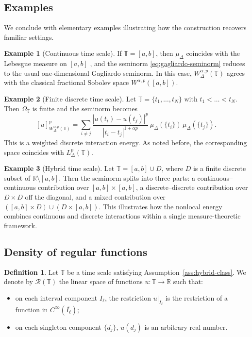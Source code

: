 \documentclass[11pt,a4paper]{article}
\numberwithin{equation}{section}
\theoremstyle{definition}
\newtheorem{definition}[definition]{Definition}
\newtheorem{example}[example]{Example}
\newcommand{\R}{\mathbb{R}}
\newcommand{\T}{\mathbb{T}}
\begin{document}
\subsection{Examples}\label{subsec:examples}

We conclude with elementary examples illustrating how the construction recovers familiar settings.

\begin{example}[Continuous time scale]\label{ex:continuous}
If $\T=[a,b]$, then $\mu_\Delta$ coincides with the Lebesgue measure on $[a,b]$ \cite[Theorem~5.2]{CabadaVivero2006}, and the seminorm \eqref{eq:gagliardo-seminorm} reduces to the usual one-dimensional Gagliardo seminorm. In this case, $W^{\alpha,p}_{\Delta}(\T)$ agrees with the classical fractional Sobolev space $W^{\alpha,p}([a,b])$.
\end{example}

\begin{example}[Finite discrete time scale]\label{ex:discrete}
Let $\T=\{t_1,\dots,t_N\}$ with $t_1<\dots<t_N$. Then $\Omega_{\T}$ is finite and the seminorm becomes
\[
[u]_{W^{\alpha,p}_{\Delta}(\T)}^p
=
\sum_{i\ne j}
\frac{|u(t_i)-u(t_j)|^p}{|t_i-t_j|^{1+\alpha p}}
\,\mu_\Delta(\{t_i\})\,\mu_\Delta(\{t_j\}).
\]
This is a weighted discrete interaction energy. As noted before, the corresponding space coincides with $L^p_\Delta(\T)$.
\end{example}

\begin{example}[Hybrid time scale]\label{ex:hybrid}
Let $\T=[a,b]\cup D$, where $D$ is a finite discrete subset of $\R\setminus[a,b]$. Then the seminorm splits into three parts: a continuous--continuous contribution over $[a,b]\times[a,b]$, a discrete--discrete contribution over $D\times D$ off the diagonal, and a mixed contribution over $([a,b]\times D)\cup(D\times[a,b])$. This illustrates how the nonlocal energy combines continuous and discrete interactions within a single measure-theoretic framework.
\end{example}
\subsection{Density of regular functions}

\begin{definition}\label{def:regular-class}
Let $\mathbb{T}$ be a time scale satisfying Assumption~\ref{ass:hybrid-class}. 
We denote by $\mathcal{R}(\mathbb{T})$ the linear space of functions 
$u : \mathbb{T} \to \mathbb{R}$ such that:
\begin{itemize}
  \item on each interval component $I_\ell$, the restriction $u|_{I_\ell}$ 
        is the restriction of a function in $C^\infty(\overline{I_\ell})$;
  \item on each singleton component $\{d_j\}$, $u(d_j)$ is an arbitrary 
        real number.
\end{itemize}
\end{definition}
\end{document}
